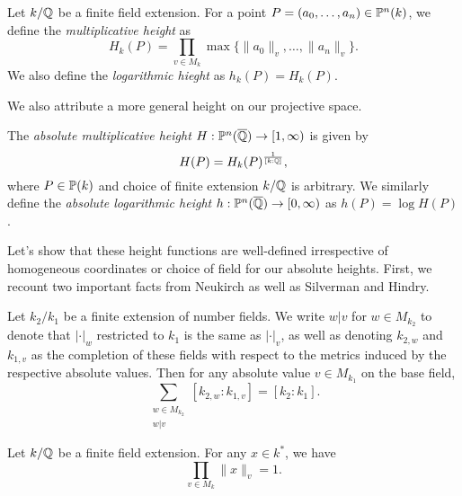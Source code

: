 \documentclass[12pt]{article}
\begin{document}
    \begin{definition}
        Let $k/\mathbb{Q}$ be a finite field extension.
        For a point $P = (a_0, \ldots, a_n) \in \mathbb{P}^n(k)$,
        we define the \textit{multiplicative height} as
        \[
            H_k(P) = \prod_{v \in M_k} \max\{\|a_0\|_v, \ldots, \|a_n\|_v\}.
        \]
        We also define the \textit{logarithmic hieght} as $h_k(P) = H_k(P)$.
    \end{definition}

    We also attribute a more general height on our projective space.

    \begin{definition}
        The \textit{absolute multiplicative height} $H: \mathbb{P}^n(\overline{\mathbb{Q}}) \to [1, \infty)$ is given by 
        \[
            H(P) = H_k(P)^{\frac{1}{[k : \mathbb{Q}]}},
        \]
        where $P \in \mathbb{P}(k)$ and choice of finite extension $k/\mathbb{Q}$ is arbitrary.
        We similarly define the \textit{absolute logarithmic height} $h : \mathbb{P}^n(\overline{\mathbb{Q}}) \to [0, \infty)$ as $h(P) = \log H(P)$.
    \end{definition}

    Let's show that these height functions are well-defined irrespective of homogeneous coordinates or choice of field for our absolute heights.
    First, we recount two important facts from Neukirch as well as Silverman and Hindry.

    \begin{lemma}
        Let $k_2 / k_1$ be a finite extension of number fields.
        We write $w | v$ for $w \in M_{k_2}$ to denote that $|\cdot|_w$ restricted to $k_1$ is the same as $|\cdot|_v$,
        as well as denoting $k_{2, w}$ and $k_{1, v}$ as the completion of these fields with respect to the metrics induced by the respective absolute values.
        Then for any absolute value $v \in M_{k_1}$ on the base field,
        \[
            \sum_{\substack{
                w \in M_{k_2} \\
                w | v
            }} [k_{2, w} : k_{1, v}] = [k_2 : k_1].
        \]
    \end{lemma}

    \begin{lemma}
        Let $k/\mathbb{Q}$ be a finite field extension.
        For any $x \in k^*$, we have
        \[
            \prod_{v \in M_k} \|x\|_v = 1.
        \]
    \end{lemma}
\end{document}
